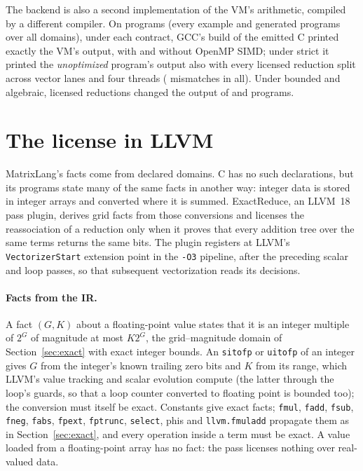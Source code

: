 \documentclass[acmsmall,review,anonymous,nonacm]{acmart}
\begin{document}
The backend is also a second implementation of the VM's arithmetic, compiled by
a different compiler. On \RqEmitPrograms{} programs (every example and generated
programs over all domains), under each contract, GCC's build of the emitted C
printed exactly the VM's output, with and without OpenMP SIMD; under strict it
printed the \emph{unoptimized} program's output also with every licensed
reduction split across vector lanes and four threads (\RqEmitMismatches{}
mismatches in all). Under bounded and algebraic, licensed reductions changed
the output of \RqEmitChangedBounded{} and \RqEmitChangedAlgebraic{} programs.

\section{The license in LLVM}\label{sec:llvm}
MatrixLang's facts come from declared domains. C has no such declarations, but
its programs state many of the same facts in another way: integer data is
stored in integer arrays and converted where it is summed. ExactReduce, an
LLVM~18 pass plugin, derives grid facts from
those conversions and licenses the reassociation of a reduction only when it
proves that every addition tree over the same terms returns the same bits.
The plugin registers at LLVM's \texttt{VectorizerStart} extension point in
the \texttt{-O3} pipeline, after the preceding scalar and loop passes, so
that subsequent vectorization reads its decisions.

\paragraph{Facts from the IR\@.} A fact $(G,K)$ about a floating-point value
states that it is an integer multiple of $2^G$ of magnitude at most $K2^G$,
the grid--magnitude domain of Section~\ref{sec:exact} with exact integer
bounds. An \texttt{sitofp} or \texttt{uitofp} of an integer gives $G$ from the
integer's known trailing zero bits and $K$ from its range, which LLVM's value
tracking and scalar evolution compute (the latter through the loop's guards,
so that a loop counter converted to floating point is bounded too); the
conversion must itself be exact. Constants give exact facts;
\texttt{fmul}, \texttt{fadd}, \texttt{fsub}, \texttt{fneg}, \texttt{fabs},
\texttt{fpext}, \texttt{fptrunc}, \texttt{select}, phis and
\texttt{llvm.fmuladd} propagate them as in Section~\ref{sec:exact}, and every
operation inside a term must be exact. A value loaded from a floating-point
array has no fact: the pass licenses nothing over real-valued data.
\end{document}
